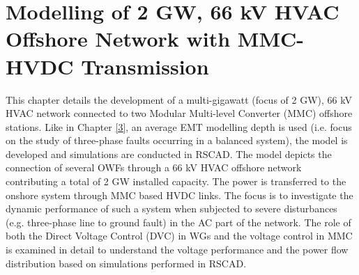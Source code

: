 \chapter{Modelling of 2 GW, 66 kV HVAC Offshore Network with MMC-HVDC Transmission}\label{4}
This chapter details the development of a multi-gigawatt (focus of 2 GW), 66 kV \gls{HVAC} network connected to two Modular Multi-level Converter (\gls{MMC}) offshore stations. Like in Chapter \ref{3}, an average \gls{EMT} modelling depth is used (i.e. focus on the study of three-phase faults occurring in a balanced system), the model is developed and simulations are conducted in RSCAD. The model depicts the connection of several \gls{OWF}s through a 66 kV \gls{HVAC} offshore network contributing a total of 2 GW installed capacity. The power is transferred to the onshore system through \gls{MMC} based \gls{HVDC} links. The focus is to investigate the dynamic performance of such a system when subjected to severe disturbances (e.g. three-phase line to ground fault) in the \gls{AC} part of the network. The role of both the Direct Voltage Control (\gls{DVC}) in \gls{WG}s and the voltage control in \gls{MMC} is examined in detail to understand the voltage performance and the power flow distribution based on simulations performed in RSCAD. %

